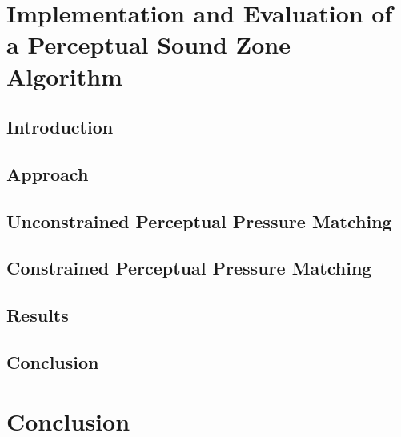 \documentclass[10pt,twoside,openright,titlepage]{ce}
\begin{document}
\chapter{Implementation and Evaluation of a Perceptual Sound Zone Algorithm}
\label{ch:perceptual_sound_zone}
\section{Introduction}
\label{ch:perceptual_sound_zone:introduction}

\newpage
\section{Approach}
\label{ch:perceptual_sound_zone:approach}

\newpage
\section{Unconstrained Perceptual Pressure Matching}
\label{ch:perceptual_sound_zone:perceptual_minimization}

\newpage
\section{Constrained Perceptual Pressure Matching}
\label{ch:perceptual_sound_zone:perceptual_constraining}

\newpage
\section{Results}
\label{ch:perceptual_sound_zone:results}

\newpage
\section{Conclusion}
\label{ch:perceptual_sound_zone:conclusion}


\chapter{Conclusion}




\appendix
\end{document}
